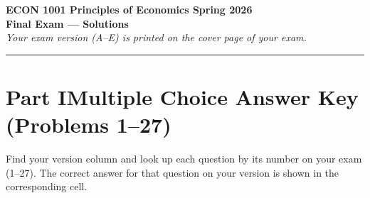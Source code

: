 \documentclass[12pt]{article}
\begin{document}
\thispagestyle{empty}
\begin{center}
  {\large\bfseries ECON 1001 \textperiodcentered{} Principles of Economics \textperiodcentered{} Spring 2026}\\[6pt]
  {\LARGE\bfseries Final Exam --- Solutions}\\[6pt]
  {\normalsize\itshape Your exam version (A--E) is printed on the cover page of your exam.}
\end{center}

\vspace{0.8em}
\noindent\rule{\linewidth}{0.6pt}
\vspace{0.5em}

\section*{Part I\quad Multiple Choice Answer Key (Problems 1--27)}

Find your version column and look up each question by its number on your exam (1--27). The correct answer for that question on your version is shown in the corresponding cell.
\end{document}
